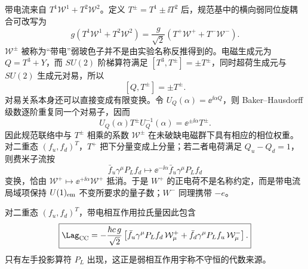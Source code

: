 \begin{proposition}
带电流来自 $T^1\mathcal W^1+T^2\mathcal W^2$。定义 $T^\pm=T^1\pm\ii T^2$ 后，规范基中的横向弱同位旋耦合可改写为
\begin{equation}
\boxed{
 g(T^1\mathcal W^1+T^2\mathcal W^2)
 =\frac g{\sqrt2}
 \left(T^+\mathcal W^++T^-\mathcal W^-\right).}
\label{eq:sm-charged-generator-dp68}
\end{equation}
$\mathcal W^\pm$ 被称为“带电”弱玻色子并不是由实验名称反推得到的。电磁生成元为 $Q=T^3+Y$，而 $SU(2)$ 阶梯算符满足 $[T^3,T^\pm]=\pm T^\pm$，同时超荷生成元与 $SU(2)$ 生成元对易，所以
\begin{equation}
\boxed{[Q,T^\pm]=\pm T^\pm.}
\label{eq:sm-w-charge-commutator-dp122}
\end{equation}
对易关系本身还可以直接变成有限变换。令 $U_Q(\alpha)=\ee^{\ii\alpha Q}$，则 Baker--Hausdorff 级数逐阶重复同一个对易子，因而
\begin{equation*}
U_Q(\alpha)T^\pm U_Q^{-1}(\alpha)
=\ee^{\pm\ii\alpha}T^\pm.
\end{equation*}
因此规范联络中与 $T^\pm$ 相乘的系数 $\mathcal W^\pm$ 在未破缺电磁群下具有相应的相位权重。对二重态 $(f_u,f_d)^T$，$T^+$ 把下分量变成上分量；若二者电荷满足 $Q_u-Q_d=1$，则费米子流按
\begin{equation*}
\bar f_u\gamma^\mu P_L f_d
\longmapsto
\ee^{-\ii\alpha}\bar f_u\gamma^\mu P_L f_d
\end{equation*}
变换，恰由 $\mathcal W^+\mapsto\ee^{+\ii\alpha}\mathcal W^+$ 抵消。于是 $W^+$ 的正电荷不是名称约定，而是带电流局域项保持 $U(1)_{\rm em}$ 不变所要求的量子数；$W^-$ 同理携带 $-e$。

对二重态 $(f_u,f_d)^T$，带电相互作用拉氏量因此包含
\begin{equation}
 \boxed{
 \Lag_{\rm CC}
 =-\frac{\hbar c\,g}{\sqrt2}
 \left[
 \bar f_u\gamma^\mu P_L f_d\,\mathcal W_\mu^+
 +\bar f_d\gamma^\mu P_L f_u\,\mathcal W_\mu^-
 \right].}
 \label{eq:sm-charged-current-preflavor-dp11}
\end{equation}
只有左手投影算符 $P_L$ 出现，这正是弱相互作用宇称不守恒的代数来源。
\end{proposition}

